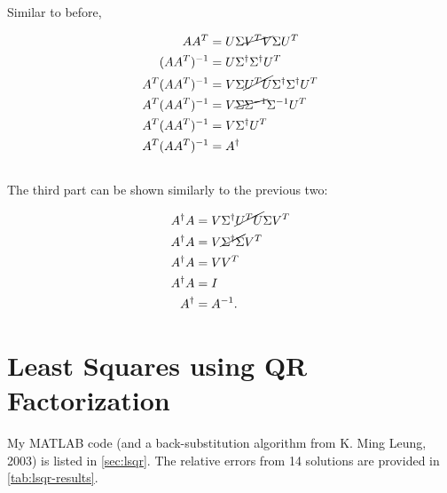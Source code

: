 \documentclass{template}
\begin{document}
\subsection{}

Similar to before,

\begin{equation}
  \begin{aligned}
    A A^T &= U\Sigma \cancel{V^T V} \Sigma U^T\\
    (A A^T)^{-1} &= U \Sigma^\dagger\Sigma^\dagger U^T\\
    A^T(A A^T)^{-1} &= V \Sigma \cancel{U^T U} \Sigma^\dagger\Sigma^\dagger U^T\\
    A^T(A A^T)^{-1} &= V \cancel{\Sigma\Sigma^{-1}}\Sigma^{-1} U^T\\
    A^T(A A^T)^{-1} &= V \Sigma^\dagger U^T\\
    A^T(A A^T)^{-1} &= A^\dagger\\
  \end{aligned}
\end{equation}

\subsection{}

The third part can be shown similarly to the previous two:

\begin{equation}
  \begin{aligned}
    A^\dagger A &= V \Sigma^\dagger \cancel{U^T U} \Sigma V^T\\
    A^\dagger A &= V \cancel{\Sigma^\dagger \Sigma} V^T\\
    A^\dagger A &= V  V^T\\
    A^\dagger A &= I\\
    A^\dagger &= A^{-1}.
  \end{aligned}
\end{equation}

\section{Least Squares using QR Factorization}

My MATLAB code (and a back-substitution algorithm from K. Ming Leung, 2003) is listed in \autoref{sec:lsqr}. The relative errors from 14 solutions are provided in \autoref{tab:lsqr-results}.
\end{document}
